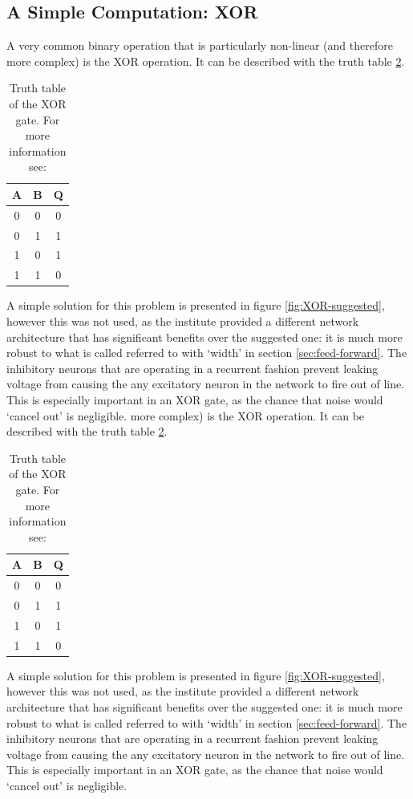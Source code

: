 \documentclass[a4paper,twocolumn]{article}
\begin{document}
\subsection{A Simple Computation: XOR}
A very common binary operation that is particularly non-linear (and therefore
more complex) is the XOR operation. It can be described with the truth
table \ref{tab:XOR}.
\begin{table}
    \centering
    \begin{tabular}{c | c | c}
        A & B & Q \\ \hline
        0 & 0 & 0 \\
        0 & 1 & 1 \\
        1 & 0 & 1 \\
        1 & 1 & 0
    \end{tabular}
    \caption{Truth table of the XOR gate. For more information see: \cite{horowitz_hill_2020}}
    \label{tab:XOR}
\end{table}
A simple solution for this problem is presented in figure
\ref{fig:XOR-suggested}, however this was not used, as the institute provided a
different network architecture that has significant benefits over the suggested
one: it is much more robust to what is called referred to with `width' in
section \ref{sec:feed-forward}. The inhibitory neurons that are operating in a
recurrent fashion prevent leaking voltage from causing the any excitatory
neuron in the network to fire out of line. This is especially important in an
XOR gate, as the chance that noise would `cancel out' is negligible.
more complex) is the XOR operation. It can be described with the truth
table \ref{tab:XOR}.
\begin{table}
    \centering
    \begin{tabular}{c | c | c}
        A & B & Q \\ \hline
        0 & 0 & 0 \\
        0 & 1 & 1 \\
        1 & 0 & 1 \\
        1 & 1 & 0
    \end{tabular}
    \caption{Truth table of the XOR gate. For more information see: \cite{horowitz_hill_2020}}
    \label{tab:XOR}
\end{table}
A simple solution for this problem is presented in figure
\ref{fig:XOR-suggested}, however this was not used, as the institute provided a
different network architecture that has significant benefits over the suggested
one: it is much more robust to what is called referred to with `width' in
section \ref{sec:feed-forward}. The inhibitory neurons that are operating in a
recurrent fashion prevent leaking voltage from causing the any excitatory
neuron in the network to fire out of line. This is especially important in an
XOR gate, as the chance that noise would `cancel out' is negligible.
\end{document}
